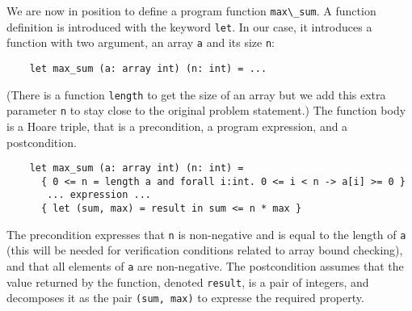 We are now in position to define a program function
\verb|max\_sum|. A function definition is introduced with the keyword
\texttt{let}. In our case, it introduces a function with two argument,
an array \texttt{a} and its size \texttt{n}:
\begin{verbatim}
    let max_sum (a: array int) (n: int) = ...
\end{verbatim}
(There is a function \texttt{length} to get the size of an array but
we add this extra parameter \texttt{n} to stay close to the original
problem statement.) The function body is a Hoare triple, that is a
precondition, a program expression, and a postcondition.
\begin{verbatim}
    let max_sum (a: array int) (n: int) =
      { 0 <= n = length a and forall i:int. 0 <= i < n -> a[i] >= 0 }
       ... expression ...
      { let (sum, max) = result in sum <= n * max }
\end{verbatim}
The precondition expresses that \texttt{n} is non-negative and is
equal to the length of \texttt{a} (this will be needed for
verification conditions related to array bound checking), and that all
elements of \texttt{a} are non-negative.
The postcondition assumes that the value returned by the function,
denoted \texttt{result}, is a pair of integers, and decomposes it as
the pair \texttt{(sum, max)} to expresse the required property.


